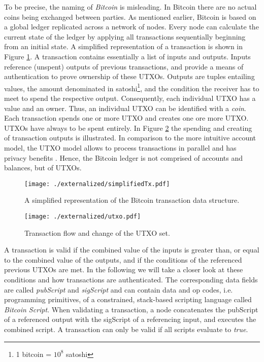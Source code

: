 To be precise, the naming of \emph{Bitcoin} is misleading. In Bitcoin there are no actual coins being exchanged between parties. As mentioned earlier, Bitcoin is based on a global ledger replicated across a network of nodes. Every node can calculate the current state of the ledger by applying all transactions sequentially beginning from an initial state. A simplified representation of a transaction is shown in Figure \ref{fig:bitcointx}. 
A transaction contains essentially a list of inputs and outputs. Inputs reference (unspent) outputs of previous transactions, and provide a means of authentication to prove ownership of these \ac{UTXO}s. Outputs are tuples entailing values, the amount denominated in satoshi\footnote{1 bitcoin = $10^8$ satoshi}, and the condition the receiver has to meet to spend the respective output. Consequently, each individual \ac{UTXO} has a value and an owner. Thus, an individual \ac{UTXO} can be identified with a \emph{coin}. Each transaction spends one or more \ac{UTXO} and creates one ore more \ac{UTXO}. \ac{UTXO}s have always to be spent entirely. In Figure \ref{fig:utxo} the spending and creating of transaction outputs is illustrated. 
In comparison to the more intuitive account model, the \ac{UTXO} model allows to process transactions in parallel and has privacy benefits \parencite{buterin2016utxo}. Hence, the Bitcoin ledger is not comprised of accounts and balances, but of \ac{UTXO}s. 

\begin{figure}
\centering
\texttt{[image: ./externalized/simplifiedTx.pdf]}
\caption{A simplified representation of the Bitcoin transaction data structure.}
\label{fig:bitcointx}
\end{figure}

\begin{figure}
\centering
\texttt{[image: ./externalized/utxo.pdf]}
\caption{Transaction flow and change of the \ac{UTXO} set.}
\label{fig:utxo}
\end{figure}

A transaction is valid if the combined value of the inputs is greater than, or equal to the combined value of the outputs, and if the conditions of the referenced previous \ac{UTXO}s are met.
In the following we will take a closer look at these conditions and how transactions are authenticated. The corresponding data fields are called \emph{pubScript} and \emph{sigScript} and can contain data and op codes, i.e. programming primitives, of a constrained, stack-based scripting language called \emph{Bitcoin Script}. 
When validating a transaction, a node concatenates the pubScript of a referenced output with the sigScript of a referencing input, and executes the combined script. A transaction can only be valid if all scripts evaluate to \emph{true}. 

